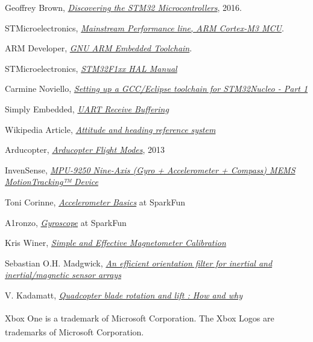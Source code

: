 \documentclass[a4paper,12pt,oneside]{book}
\begin{document}
\begin{thebibliography}{20}

Geoffrey Brown,
\href{https://www.cs.indiana.edu/~geobrown/book.pdf}{\textit{Discovering the STM32 Microcontrollers}}, 2016.

STMicroelectronics, \href{http://www.st.com/content/st_com/en/products/microcontrollers/stm32-32-bit-arm-cortex-mcus/stm32f1-series/stm32f103/stm32f103rb.html}{\textit{Mainstream Performance line, ARM Cortex-M3 MCU}}.

ARM Developer, \href{https://developer.arm.com/open-source/gnu-toolchain/gnu-rm}{\textit{GNU ARM Embedded Toolchain}}.

STMicroelectronics, \href{./datasheets/STM32F1 HAL Manual.pdf}{\textit{STM32F1xx HAL Manual}}

Carmine Noviello, \href{http://www.carminenoviello.com/2014/12/28/setting-gcceclipse-toolchain-stm32nucleo-part-1/}{\textit{Setting up a GCC/Eclipse toolchain for STM32Nucleo - Part 1}}

Simply Embedded, \href{http://www.simplyembedded.org/tutorials/interrupt-free-ring-buffer/}{\textit{UART Receive Buffering}}

Wikipedia Article, \href{https://en.wikipedia.org/wiki/Attitude_and_heading_reference_system}{\textit{Attitude and heading reference system}}

Arducopter, \href{http://www.arducopter.co.uk/all-arducopter-guides/arducopter-flight-modes}{\textit{
Arducopter Flight Modes}}, 2013

InvenSense, \href{https://www.invensense.com/products/motion-tracking/9-axis/mpu-9250/}{\textit{MPU-9250 Nine-Axis (Gyro + Accelerometer + Compass) MEMS MotionTracking™ Device}}

Toni Corinne, \href{https://www.sparkfun.com/users/194976}{\textit{Accelerometer Basics}} at SparkFun

A1ronzo, \href{https://learn.sparkfun.com/tutorials/gyroscope/how-a-gyro-works}{\textit{Gyroscope}} at SparkFun

Kris Winer, \href{https://github.com/kriswiner/MPU6050/wiki/Simple-and-Effective-Magnetometer-Calibration}{\textit{Simple and Effective Magnetometer Calibration}}

Sebastian O.H. Madgwick, \href{./datasheets/Madgwick Internal Report.pdf}{\textit{An efficient orientation filter for inertial and inertial/magnetic sensor arrays}}

V. Kadamatt, \href{http://www.droneybee.com/quadcopter-blade-rotation-lift/}{\textit{Quadcopter blade rotation and lift : How and why}}

Xbox\textsuperscript{\textregistered} One is a trademark of Microsoft Corporation. The Xbox\textsuperscript{\textregistered} Logos are trademarks of Microsoft\textsuperscript{\textregistered} Corporation.

\end{thebibliography}

\end{document}
